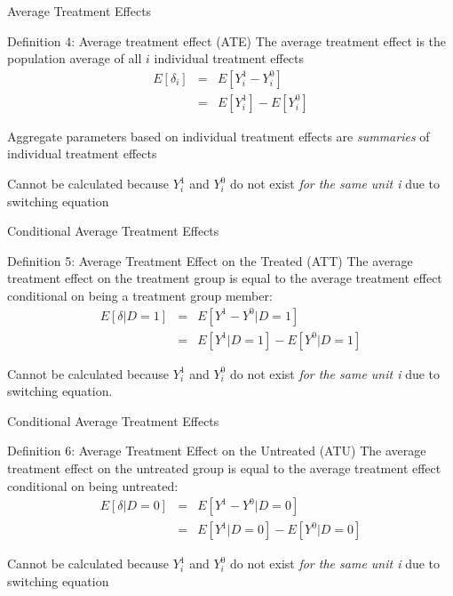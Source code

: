 \documentclass{beamer}
\begin{document}
\begin{frame}{Average Treatment Effects}

  \begin{block}{Definition 4: Average treatment effect (ATE)}
    The average treatment effect is the population average of all $i$ individual treatment effects
    \begin{eqnarray*}
      E[\delta_i]&=&E[Y_i^1-Y_i^0]\\
      &=&E[Y^1_i] - E[Y^0_i]
    \end{eqnarray*}
  \end{block}

  \bigskip

Aggregate parameters based on individual treatment effects are \emph{summaries} of individual treatment effects

\bigskip

  Cannot be calculated because $Y^1_i$ and $Y^0_i$ do not exist \emph{for the same unit i} due to switching equation

\end{frame}



\begin{frame}{Conditional Average Treatment Effects}


  \begin{block}{Definition 5: Average Treatment Effect on the Treated (ATT)}
    The average treatment effect on the treatment group is equal to the average treatment effect conditional on being a treatment group member:
    \begin{eqnarray*}
      E[\delta|D=1]&=&E[Y^1-Y^0|D=1] \nonumber \\
      &=&E[Y^1|D=1]-E[Y^0|D=1]
    \end{eqnarray*}
  \end{block}
  Cannot be calculated because $Y^1_i$ and $Y^0_i$ do not exist \emph{for the same unit i} due to switching equation. 


\end{frame}



\begin{frame}{Conditional Average Treatment Effects}

  \begin{block}{Definition 6: Average Treatment Effect on the Untreated (ATU)}
    The average treatment effect on the untreated group is equal to the average treatment effect conditional on being untreated:
    \begin{eqnarray*}
      E[\delta|D=0]&=&E[Y^1-Y^0|D=0] \nonumber \\
      &=&E[Y^1|D=0]-E[Y^0|D=0]
    \end{eqnarray*}
  \end{block}
  Cannot be calculated because $Y^1_i$ and $Y^0_i$ do not exist \emph{for the same unit i} due to switching equation

\end{frame}
\end{document}

